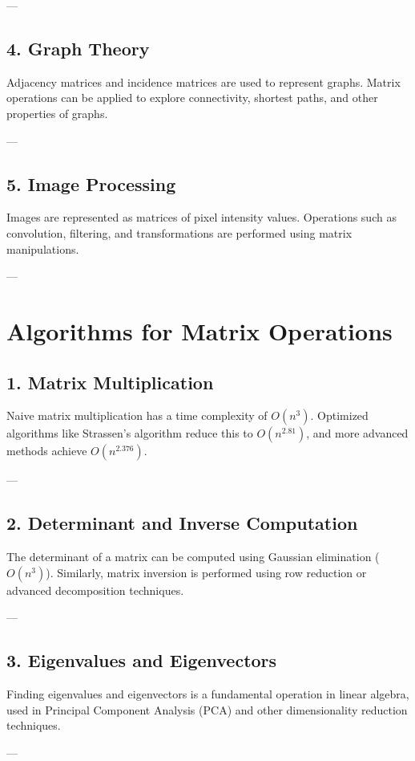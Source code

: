 ---

\subsection*{4. Graph Theory}
Adjacency matrices and incidence matrices are used to represent graphs. Matrix operations can be applied to explore connectivity, shortest paths, and other properties of graphs.

---

\subsection*{5. Image Processing}
Images are represented as matrices of pixel intensity values. Operations such as convolution, filtering, and transformations are performed using matrix manipulations.

---

\section*{Algorithms for Matrix Operations}

\subsection*{1. Matrix Multiplication}
Naive matrix multiplication has a time complexity of \(O(n^3)\). Optimized algorithms like Strassen's algorithm reduce this to \(O(n^{2.81})\), and more advanced methods achieve \(O(n^{2.376})\).

---

\subsection*{2. Determinant and Inverse Computation}
The determinant of a matrix can be computed using Gaussian elimination (\(O(n^3)\)). Similarly, matrix inversion is performed using row reduction or advanced decomposition techniques.

---

\subsection*{3. Eigenvalues and Eigenvectors}
Finding eigenvalues and eigenvectors is a fundamental operation in linear algebra, used in Principal Component Analysis (PCA) and other dimensionality reduction techniques.

---


